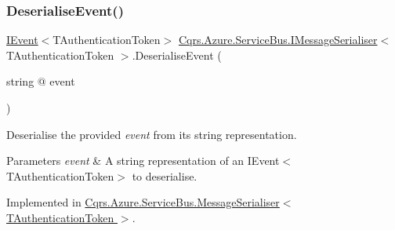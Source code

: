 \mbox{\label{interfaceCqrs_1_1Azure_1_1ServiceBus_1_1IMessageSerialiser_ab65c6e4a8c2a660ceb2236ee11fd33f6_ab65c6e4a8c2a660ceb2236ee11fd33f6}} 
\subsubsection{\texorpdfstring{Deserialise\+Event()}{DeserialiseEvent()}}
{\footnotesize\ttfamily \hyperlink{interfaceCqrs_1_1Events_1_1IEvent}{I\+Event}$<$T\+Authentication\+Token$>$ \hyperlink{interfaceCqrs_1_1Azure_1_1ServiceBus_1_1IMessageSerialiser}{Cqrs.\+Azure.\+Service\+Bus.\+I\+Message\+Serialiser}$<$ T\+Authentication\+Token $>$.Deserialise\+Event (\begin{DoxyParamCaption}\item[{string @}]{event }\end{DoxyParamCaption})}



Deserialise the provided {\itshape event}  from its string representation. 


\begin{DoxyParams}{Parameters}
{\em event} & A string representation of an I\+Event$<$\+T\+Authentication\+Token$>$ to deserialise.\\
\hline
\end{DoxyParams}


Implemented in \hyperlink{classCqrs_1_1Azure_1_1ServiceBus_1_1MessageSerialiser_a9207c867f358e352eee5d3727fe620e4_a9207c867f358e352eee5d3727fe620e4}{Cqrs.\+Azure.\+Service\+Bus.\+Message\+Serialiser$<$ T\+Authentication\+Token $>$}.

\mbox{\label{interfaceCqrs_1_1Azure_1_1ServiceBus_1_1IMessageSerialiser_a7454ac36eca3dd37d0c596e0406b4c81_a7454ac36eca3dd37d0c596e0406b4c81}} 
